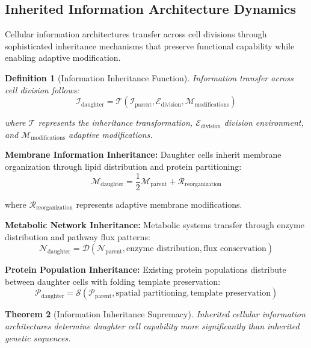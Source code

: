 \documentclass[12pt,a4paper]{article}
\newtheorem{theorem}{Theorem}[section]
\newtheorem{definition}[theorem]{Definition}
\begin{document}
\subsection{Inherited Information Architecture Dynamics}

Cellular information architectures transfer across cell divisions through sophisticated inheritance mechanisms that preserve functional capability while enabling adaptive modification.

\begin{definition}[Information Inheritance Function]
Information transfer across cell division follows:
$$\mathcal{I}_{\text{daughter}} = \mathcal{T}(\mathcal{I}_{\text{parent}}, \mathcal{E}_{\text{division}}, \mathcal{M}_{\text{modifications}})$$

where $\mathcal{T}$ represents the inheritance transformation, $\mathcal{E}_{\text{division}}$ division environment, and $\mathcal{M}_{\text{modifications}}$ adaptive modifications.
\end{definition}

\textbf{Membrane Information Inheritance:}
Daughter cells inherit membrane organization through lipid distribution and protein partitioning:
$$\mathcal{M}_{\text{daughter}} = \frac{1}{2}\mathcal{M}_{\text{parent}} + \mathcal{R}_{\text{reorganization}}$$

where $\mathcal{R}_{\text{reorganization}}$ represents adaptive membrane modifications.

\textbf{Metabolic Network Inheritance:}
Metabolic systems transfer through enzyme distribution and pathway flux patterns:
$$\mathcal{N}_{\text{daughter}} = \mathcal{D}(\mathcal{N}_{\text{parent}}, \text{enzyme distribution}, \text{flux conservation})$$

\textbf{Protein Population Inheritance:}
Existing protein populations distribute between daughter cells with folding template preservation:
$$\mathcal{P}_{\text{daughter}} = \mathcal{S}(\mathcal{P}_{\text{parent}}, \text{spatial partitioning}, \text{template preservation})$$

\begin{theorem}[Information Inheritance Supremacy]
Inherited cellular information architectures determine daughter cell capability more significantly than inherited genetic sequences.
\end{theorem}
\end{document}
